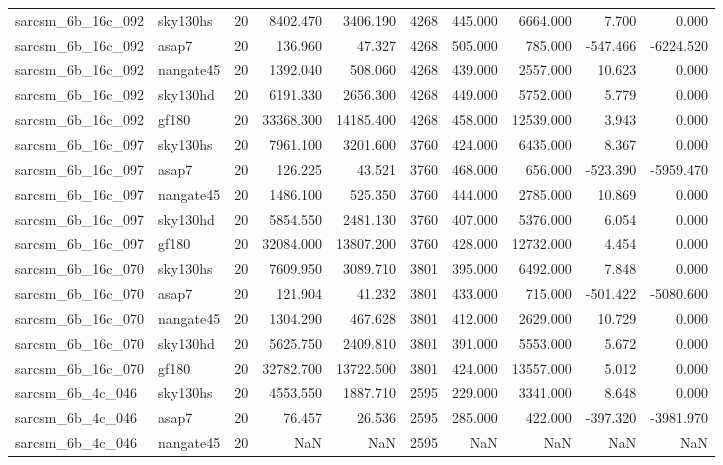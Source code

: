 \begin{longtable}{llrrrrrrrr}
sarcsm\_6b\_16c\_092 & sky130hs & 20 & 8402.470 & 3406.190 & 4268 & 445.000 & 6664.000 & 7.700 & 0.000 \\
sarcsm\_6b\_16c\_092 & asap7 & 20 & 136.960 & 47.327 & 4268 & 505.000 & 785.000 & -547.466 & -6224.520 \\
sarcsm\_6b\_16c\_092 & nangate45 & 20 & 1392.040 & 508.060 & 4268 & 439.000 & 2557.000 & 10.623 & 0.000 \\
sarcsm\_6b\_16c\_092 & sky130hd & 20 & 6191.330 & 2656.300 & 4268 & 449.000 & 5752.000 & 5.779 & 0.000 \\
sarcsm\_6b\_16c\_092 & gf180 & 20 & 33368.300 & 14185.400 & 4268 & 458.000 & 12539.000 & 3.943 & 0.000 \\
sarcsm\_6b\_16c\_097 & sky130hs & 20 & 7961.100 & 3201.600 & 3760 & 424.000 & 6435.000 & 8.367 & 0.000 \\
sarcsm\_6b\_16c\_097 & asap7 & 20 & 126.225 & 43.521 & 3760 & 468.000 & 656.000 & -523.390 & -5959.470 \\
sarcsm\_6b\_16c\_097 & nangate45 & 20 & 1486.100 & 525.350 & 3760 & 444.000 & 2785.000 & 10.869 & 0.000 \\
sarcsm\_6b\_16c\_097 & sky130hd & 20 & 5854.550 & 2481.130 & 3760 & 407.000 & 5376.000 & 6.054 & 0.000 \\
sarcsm\_6b\_16c\_097 & gf180 & 20 & 32084.000 & 13807.200 & 3760 & 428.000 & 12732.000 & 4.454 & 0.000 \\
sarcsm\_6b\_16c\_070 & sky130hs & 20 & 7609.950 & 3089.710 & 3801 & 395.000 & 6492.000 & 7.848 & 0.000 \\
sarcsm\_6b\_16c\_070 & asap7 & 20 & 121.904 & 41.232 & 3801 & 433.000 & 715.000 & -501.422 & -5080.600 \\
sarcsm\_6b\_16c\_070 & nangate45 & 20 & 1304.290 & 467.628 & 3801 & 412.000 & 2629.000 & 10.729 & 0.000 \\
sarcsm\_6b\_16c\_070 & sky130hd & 20 & 5625.750 & 2409.810 & 3801 & 391.000 & 5553.000 & 5.672 & 0.000 \\
sarcsm\_6b\_16c\_070 & gf180 & 20 & 32782.700 & 13722.500 & 3801 & 424.000 & 13557.000 & 5.012 & 0.000 \\
sarcsm\_6b\_4c\_046 & sky130hs & 20 & 4553.550 & 1887.710 & 2595 & 229.000 & 3341.000 & 8.648 & 0.000 \\
sarcsm\_6b\_4c\_046 & asap7 & 20 & 76.457 & 26.536 & 2595 & 285.000 & 422.000 & -397.320 & -3981.970 \\
sarcsm\_6b\_4c\_046 & nangate45 & 20 & NaN & NaN & 2595 & NaN & NaN & NaN & NaN \\

\end{longtable}
